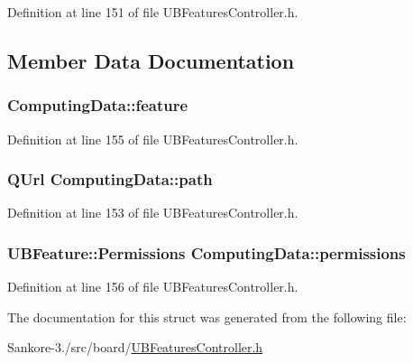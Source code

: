 Definition at line 151 of file U\-B\-Features\-Controller.\-h.



\subsection{Member Data Documentation}
\hypertarget{struct_computing_data_aca45a94b8bdf32b0e772d0c3301a1f4d}{
\subsubsection[{feature}]{ Computing\-Data\-::feature}}\label{d8/dda/struct_computing_data_aca45a94b8bdf32b0e772d0c3301a1f4d}


Definition at line 155 of file U\-B\-Features\-Controller.\-h.

\hypertarget{struct_computing_data_a0c181f62b85f3f08889379541656e2d0}{
\subsubsection[{path}]{\setlength{\rightskip}{0pt plus 5cm}Q\-Url Computing\-Data\-::path}}\label{d8/dda/struct_computing_data_a0c181f62b85f3f08889379541656e2d0}


Definition at line 153 of file U\-B\-Features\-Controller.\-h.

\hypertarget{struct_computing_data_a4cd8a3010acf3789b52b5663b9de3ef3}{
\subsubsection[{permissions}]{\setlength{\rightskip}{0pt plus 5cm}U\-B\-Feature\-::\-Permissions Computing\-Data\-::permissions}}\label{d8/dda/struct_computing_data_a4cd8a3010acf3789b52b5663b9de3ef3}


Definition at line 156 of file U\-B\-Features\-Controller.\-h.



The documentation for this struct was generated from the following file\-:\begin{DoxyCompactItemize}
\item 
Sankore-\/3./src/board/\hyperlink{_u_b_features_controller_8h}{U\-B\-Features\-Controller.\-h}\end{DoxyCompactItemize}
